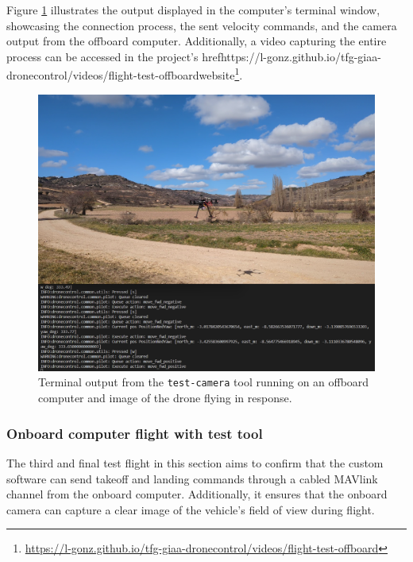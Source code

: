 Figure \ref{fig:flight-test-cam-offboard} illustrates the output displayed in the computer's terminal window, showcasing the connection process, the sent velocity commands, and the camera output from the offboard computer. Additionally, a video capturing the entire process can be accessed in the project's href{https://l-gonz.github.io/tfg-giaa-dronecontrol/videos/flight-test-offboard}{website}\footnote{\url{https://l-gonz.github.io/tfg-giaa-dronecontrol/videos/flight-test-offboard}}.

\begin{figure}
  \centering
  \includegraphics[width=\textwidth, keepaspectratio]{img/video-field-test-offboard.png}
  \caption{Terminal output from the \texttt{test-camera} tool running on an offboard computer and image of the drone flying in response.}
  \label{fig:flight-test-cam-offboard}
\end{figure}

\subsubsection{Onboard computer flight with test tool}
\label{subsec:fl-test-3}


The third and final test flight in this section aims to confirm that the custom software can send takeoff and landing commands through a cabled MAVlink channel from the onboard computer. Additionally, it ensures that the onboard camera can capture a clear image of the vehicle's field of view during flight.

